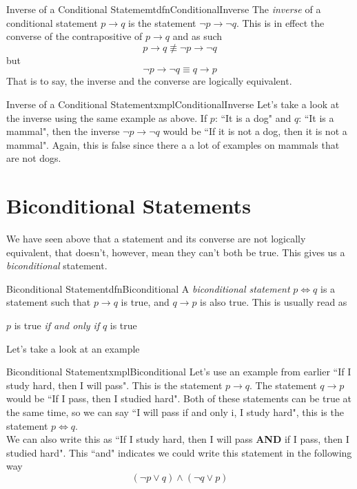 \begin{dfn}[label={def:conditionalInverse}]{Inverse of a Conditional Statememt}{dfnConditionalInverse}
    The \emph{inverse} of a conditional statement $p \to q$ is the statement $\lnot p \to \lnot q$. This is in effect the converse of the contrapositive of $p \to q$ and as such
    $$p \to q \not \equiv \lnot p \to \lnot q$$
    but
    $$\lnot p \to \lnot q \equiv q \to p$$
    That is to say, the inverse and the converse are logically equivalent.
\end{dfn}

\begin{exmpl}[label={exmpl:conditionalInverse}]{Inverse of a Conditional Statement}{xmplConditionalInverse}
    Let's take a look at the inverse using the same example as above. If $p$: ``It is a dog" and $q$: ``It is a mammal", then the inverse $\lnot p \to \lnot q$ would be ``If it is not a dog, then it is not a mammal". Again, this is false since there a a lot of examples on mammals that are not dogs.
\end{exmpl}

\section{Biconditional Statements}
We have seen above that a statement and its converse are not logically equivalent, that doesn't, however, mean they can't both be true. This gives us a \emph{biconditional} statement.

\begin{dfn}[label={def:biconditional}]{Biconditional Statement}{dfnBiconditional}
    A \emph{biconditional statement} $p \iff q$ is a statement such that $p \to q$ is true, and $q \to p$ is also true. This is usually read as \begin{center}
        $p$ is true \emph{if and only if} $q$ is true
    \end{center}
\end{dfn}

Let's take a look at an example

\begin{exmpl}[label={exmpl:biconditional}]{Biconditional Statement}{xmplBiconditional}
    Let's use an example from earlier ``If I study hard, then I will pass". This is the statement $p \to q$. The statement $q \to p$ would be ``If I pass, then I studied hard". Both of these statements can be true at the same time, so we can say ``I will pass if and only i, I study hard", this is the statement $p \iff q$.\\

    We can also write this as ``If I study hard, then I will pass \textbf{AND} if I pass, then I studied hard". This ``and" indicates we could write this statement in the following way
    $$ (\lnot p \lor q ) \land (\lnot q \lor p)$$
\end{exmpl}